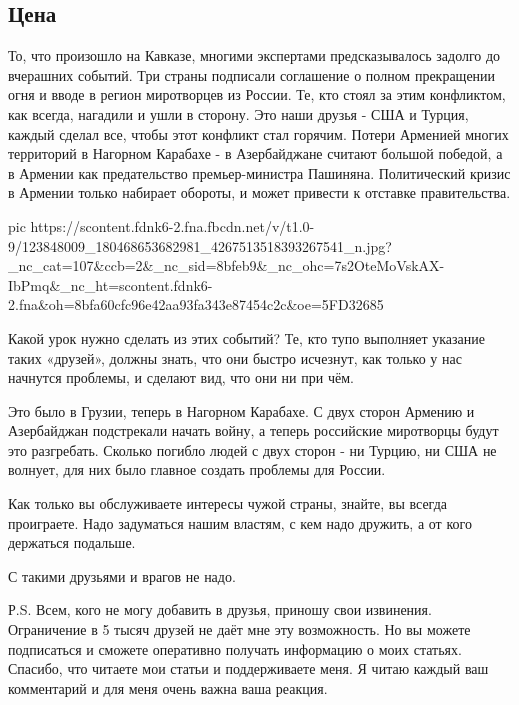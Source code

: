  
 
 

\subsection{Цена }

То, что произошло на Кавказе, многими экспертами предсказывалось задолго до
вчерашних событий. Три страны подписали соглашение о полном прекращении огня и
вводе в регион миротворцев из России. Те, кто стоял за этим конфликтом, как
всегда, нагадили и ушли в сторону. Это наши друзья - США и Турция, каждый
сделал все, чтобы этот конфликт стал горячим. Потери Арменией многих территорий
в Нагорном Карабахе - в Азербайджане считают большой победой, а в Армении как
предательство премьер-министра Пашиняна. Политический кризис в Армении только
набирает обороты, и может привести к отставке правительства.

\ifcmt
pic https://scontent.fdnk6-2.fna.fbcdn.net/v/t1.0-9/123848009_180468653682981_4267513518393267541_n.jpg?_nc_cat=107&ccb=2&_nc_sid=8bfeb9&_nc_ohc=7s2OteMoVskAX-IbPmq&_nc_ht=scontent.fdnk6-2.fna&oh=8bfa60cfc96e42aa93fa343e87454c2c&oe=5FD32685
\fi

Какой урок нужно сделать из этих событий? Те, кто тупо выполняет указание таких
«друзей», должны знать, что они быстро исчезнут, как только у нас начнутся
проблемы, и сделают вид, что они ни при чём. 

Это было в Грузии, теперь в Нагорном Карабахе. С двух сторон Армению и
Азербайджан подстрекали начать войну, а теперь российские миротворцы будут это
разгребать. Сколько погибло людей с двух сторон - ни Турцию, ни США не волнует,
для них было главное создать проблемы для России. 

Как только вы обслуживаете интересы чужой страны, знайте, вы всегда проиграете.
Надо задуматься нашим властям, с кем надо дружить, а от кого держаться
подальше.  

С такими друзьями и врагов не надо.         

Р.S. Всем, кого не могу добавить в друзья, приношу свои извинения. Ограничение
в 5 тысяч друзей не даёт мне эту возможность. Но вы можете подписаться и
сможете оперативно получать информацию о моих статьях. Спасибо, что читаете мои
статьи и поддерживаете меня. Я читаю каждый ваш комментарий и для меня очень
важна ваша реакция.

